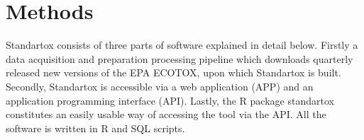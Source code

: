 \section*{Methods}

Standartox consists of three parts of software explained in detail below. Firstly a data acquisition and preparation processing pipeline which downloads quarterly released new versions of the EPA ECOTOX, upon which Standartox is built. Secondly, Standartox is accessible via a web application (APP) and an application programming interface (API). Lastly, the R package standartox constitutes an easily usable way of accessing the tool via the API. All the software is written in R \citep{rcoreteam_language_2017} and SQL scripts.

